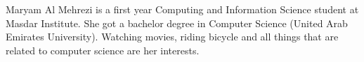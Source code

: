 \documentclass[12pt,journal,compsoc]{IEEEtran}
\begin{document}
\begin{IEEEbiographynophoto}{Maryam Al Mehrezi}
is a first year Computing and Information Science student at Masdar
Institute. She  got a bachelor degree in Computer Science (United Arab
Emirates University). Watching movies, riding bicycle and  all things
that are related to computer science are her interests. 
\end{IEEEbiographynophoto}


\vfill







\end{document}
